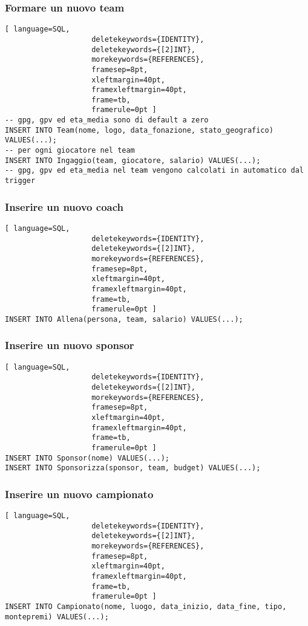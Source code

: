 \documentclass{article}
\begin{document}
\subsubsection{Formare un nuovo team}
\begin{lstlisting}[ language=SQL,
                    deletekeywords={IDENTITY},
                    deletekeywords={[2]INT},
                    morekeywords={REFERENCES},
                    framesep=8pt,
                    xleftmargin=40pt,
                    framexleftmargin=40pt,
                    frame=tb,
                    framerule=0pt ]
-- gpg, gpv ed eta_media sono di default a zero
INSERT INTO Team(nome, logo, data_fonazione, stato_geografico) VALUES(...);
-- per ogni giocatore nel team
INSERT INTO Ingaggio(team, giocatore, salario) VALUES(...);
-- gpg, gpv ed eta_media nel team vengono calcolati in automatico dal trigger
\end{lstlisting}

\subsubsection{Inserire un nuovo coach}
\begin{lstlisting}[ language=SQL,
                    deletekeywords={IDENTITY},
                    deletekeywords={[2]INT},
                    morekeywords={REFERENCES},
                    framesep=8pt,
                    xleftmargin=40pt,
                    framexleftmargin=40pt,
                    frame=tb,
                    framerule=0pt ]
INSERT INTO Allena(persona, team, salario) VALUES(...);
\end{lstlisting}

\subsubsection{Inserire un nuovo sponsor}
\begin{lstlisting}[ language=SQL,
                    deletekeywords={IDENTITY},
                    deletekeywords={[2]INT},
                    morekeywords={REFERENCES},
                    framesep=8pt,
                    xleftmargin=40pt,
                    framexleftmargin=40pt,
                    frame=tb,
                    framerule=0pt ]
INSERT INTO Sponsor(nome) VALUES(...);
INSERT INTO Sponsorizza(sponsor, team, budget) VALUES(...);
\end{lstlisting}

\subsubsection{Inserire un nuovo campionato}
\begin{lstlisting}[ language=SQL,
                    deletekeywords={IDENTITY},
                    deletekeywords={[2]INT},
                    morekeywords={REFERENCES},
                    framesep=8pt,
                    xleftmargin=40pt,
                    framexleftmargin=40pt,
                    frame=tb,
                    framerule=0pt ]
INSERT INTO Campionato(nome, luogo, data_inizio, data_fine, tipo, montepremi) VALUES(...);
\end{lstlisting}
\end{document}
